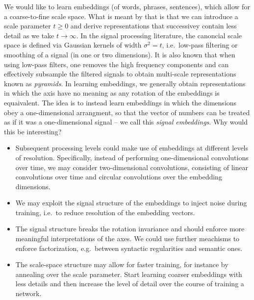 \documentclass{article}
\begin{document}
We would like to learn embeddings (of words, phrases, sentences), which allow for a coarse-to-fine scale space. What is meant by that is that we can introduce a scale parameter $t  \ge 0$ and derive representations that successivey contain less detail as we take $t \to \infty$. In the signal processing literature, the canoncial scale space is defined via Gaussian kernels of width $\sigma^2 = t$, i.e.~low-pass filtering or smoothing of a signal (in one or two dimensions). It is also known that when using low-pass filters, one removes the high frequency components and can effectively subsample the filtered signals to obtain multi-scale representations known as \textit{pyramids}. In learning embeddings, we generally obtain representations in which the axis have no meaning as any rotation of the embeddings is equaivalent. The idea is to instead learn embeddings in which the dimensions obey a one-dimensional arrangment, so that the vector of numbers can be treated as if it was a one-dimensional signal -- we call this \textit{signal embeddings}. Why would this be interesting?
\begin{itemize}
\item Subsequent processing levels could make use of embeddings at different levels of resolution. Specifically, instead of performing one-dimensional convolutions over time, we may consider two-dimensional convolutions, consisting of linear convolutions over time and circular convolutions over the embedding dimensions.
\item We may exploit the signal structure of the embeddings to inject noise during training, i.e.~to reduce  resolution of the embedding vectors.
\item The signal structure breaks  the rotation invariance and should enforce more meaningful interpretations of the axes.  We could use further meachisms to enforce factorization, e.g.~between syntactic regularities and semantic ones.
\item The scale-space structure may allow for faster training, for instance by annealing over the scale parameter. Start learning coarser embeddings with less details and then increase the level of detail over the course of training a network.
\end{itemize}
\end{document}
